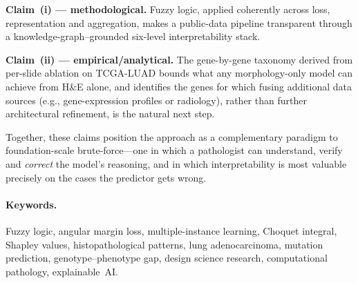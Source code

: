 \textbf{Claim~(i) --- methodological.}
Fuzzy logic, applied coherently across loss, representation and
aggregation, makes a public-data pipeline transparent through a
knowledge-graph--grounded six-level interpretability stack.

\textbf{Claim~(ii) --- empirical/analytical.}
The gene-by-gene taxonomy derived from per-slide ablation on
TCGA-LUAD bounds what any morphology-only model can achieve from
H\&E alone, and identifies the genes for which fusing additional
data sources (e.g., gene-expression profiles or radiology),
rather than further architectural refinement, is the natural
next step.

Together, these claims position the approach as a complementary
paradigm to foundation-scale brute-force---one in which a
pathologist can understand, verify and \emph{correct} the model's
reasoning, and in which interpretability is most valuable
precisely on the cases the predictor gets wrong.

\paragraph{Keywords.}
Fuzzy logic, angular margin loss, multiple-instance learning,
Choquet integral, Shapley values, histopathological patterns,
lung adenocarcinoma, mutation prediction, genotype--phenotype gap,
design science research, computational pathology, explainable~AI.
